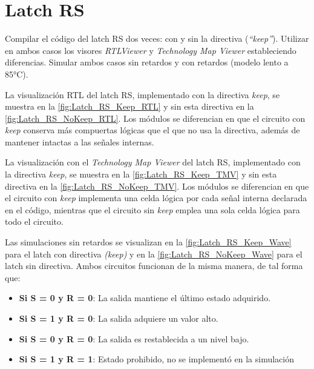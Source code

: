 \section{Latch RS \label{sec:s1}}

\begin{center}
	\begin{minipage}{12cm}
		\begin{tcolorbox}[title=Actividad 1]
			Compilar el código del latch RS dos veces: con y sin la directiva (\textit{``keep''}). Utilizar en ambos casos los visores \textit{RTLViewer} y \textit{Technology Map Viewer} estableciendo diferencias. Simular ambos casos sin retardos y con retardos (modelo lento a 85°C).
		\end{tcolorbox}	
	\end{minipage}
\end{center}

La visualización RTL del latch RS, implementado con la directiva \textit{keep}, se muestra en la \autoref{fig:Latch_RS_Keep_RTL} y sin esta directiva en la \autoref{fig:Latch_RS_NoKeep_RTL}. Los módulos se diferencian en que el circuito con \textit{keep} conserva más compuertas lógicas que el que no usa la directiva, además de mantener intactas a las señales internas.

La visualización con el \textit{Technology Map Viewer} del latch RS, implementado con la directiva \textit{keep}, se muestra en la \autoref{fig:Latch_RS_Keep_TMV} y sin esta directiva en la \autoref{fig:Latch_RS_NoKeep_TMV}. Los módulos se diferencian en que el circuito con \textit{keep} implementa una celda lógica por cada señal interna declarada en el código, mientras que el circuito sin \textit{keep} emplea una sola celda lógica para todo el circuito.

Las simulaciones sin retardos se visualizan en la \autoref{fig:Latch_RS_Keep_Wave} para el latch con directiva \textit{(keep)} y en la \autoref{fig:Latch_RS_NoKeep_Wave} para el latch sin directiva. Ambos circuitos funcionan de la misma manera, de tal forma que:

\begin{itemize}
	\item \textbf{Si S = 0 y R = 0}: La salida mantiene el último estado adquirido.
	\item \textbf{Si S = 1 y R = 0}: La salida adquiere un valor alto.
	\item \textbf{Si S = 0 y R = 0}: La salida es restablecida a un nivel bajo.
	\item \textbf{Si S = 1 y R = 1}: Estado prohibido, no se implementó en la simulación
\end{itemize}

